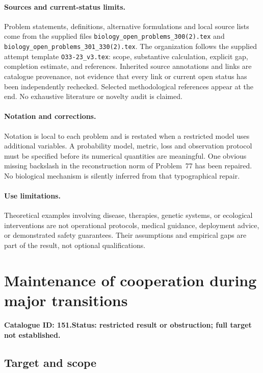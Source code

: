 \documentclass[11pt]{article}
\begin{document}
\paragraph{Sources and current-status limits.}
Problem statements, definitions, alternative formulations and local source lists
come from the supplied files
\texttt{biology\_open\_problems\_300(2).tex} and
\texttt{biology\_open\_problems\_301\_330(2).tex}.
The organization follows the supplied attempt template
\texttt{O33-23\_v3.tex}: scope, substantive calculation, explicit gap,
completion estimate, and references. Inherited source annotations and links are
catalogue provenance, not evidence that every link or current open status has
been independently rechecked. Selected methodological references appear at the
end. No exhaustive literature or novelty audit is claimed.

\paragraph{Notation and corrections.}
Notation is local to each problem and is restated when a restricted model uses
additional variables. A probability model, metric, loss and observation protocol
must be specified before its numerical quantities are meaningful. One obvious
missing backslash in the reconstruction norm of Problem~77 has been repaired.
No biological mechanism is silently inferred from that typographical repair.

\paragraph{Use limitations.}
Theoretical examples involving disease, therapies, genetic systems, or ecological
interventions are not operational protocols, medical guidance, deployment advice,
or demonstrated safety guarantees. Their assumptions and empirical gaps are part
of the result, not optional qualifications.

\setcounter{section}{150}
\section{Maintenance of cooperation during major transitions}
\label{prob:151}
\noindent\textbf{Catalogue ID: 151.}\quad \textbf{Status: restricted result or obstruction; full target not established.}
\subsection{Target and scope}
\end{document}

